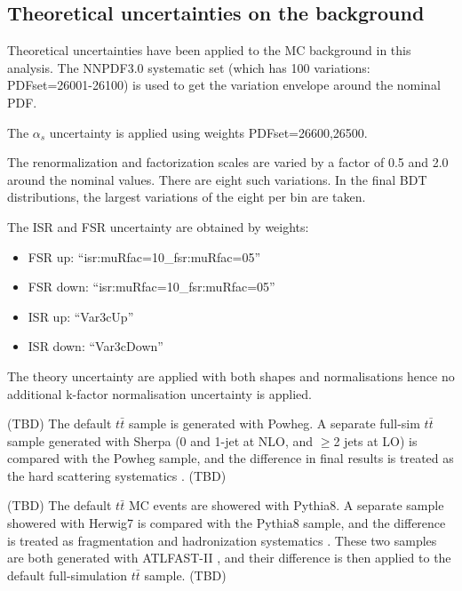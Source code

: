 \subsection{Theoretical uncertainties on the background}

Theoretical uncertainties have been applied to the MC background in this analysis. The NNPDF3.0 systematic set (which has 100 variations: PDFset=26001-26100) is used to get the variation envelope around the nominal PDF.

The $\alpha_s$ uncertainty is applied using weights PDFset=26600,26500.

The renormalization and factorization scales are varied by a factor of 0.5 and 2.0 around the nominal values. There are eight such variations. In the final BDT distributions, the largest variations of the eight per bin are taken.

The ISR and FSR uncertainty are obtained by weights:
\begin{itemize}
	\item FSR up: ``isr:muRfac=10\_fsr:muRfac=05''
	\item FSR down: ``isr:muRfac=10\_fsr:muRfac=05''
	\item ISR up: ``Var3cUp''
	\item ISR down: ``Var3cDown''
\end{itemize}

The theory uncertainty are applied with both shapes and normalisations hence no additional k-factor normalisation uncertainty is applied.

(TBD) The default $t\bar{t}$ sample is generated with Powheg. A separate full-sim $t\bar{t}$ sample generated with Sherpa (0 and 1-jet at NLO, and $\ge$2 jets at LO) is compared with the Powheg sample, and the difference in final results is treated as the hard scattering systematics \cite{ttbarSys}. (TBD)

(TBD) The default $t\bar{t}$ MC events are showered with Pythia8. A separate sample showered with Herwig7 is compared with the Pythia8 sample, and the difference is treated as fragmentation and hadronization systematics \cite{ttbarSys}. These two samples are both generated with ATLFAST-II \cite{AFII}, and their difference is then applied to the default full-simulation $t\bar{t}$ sample. (TBD)


